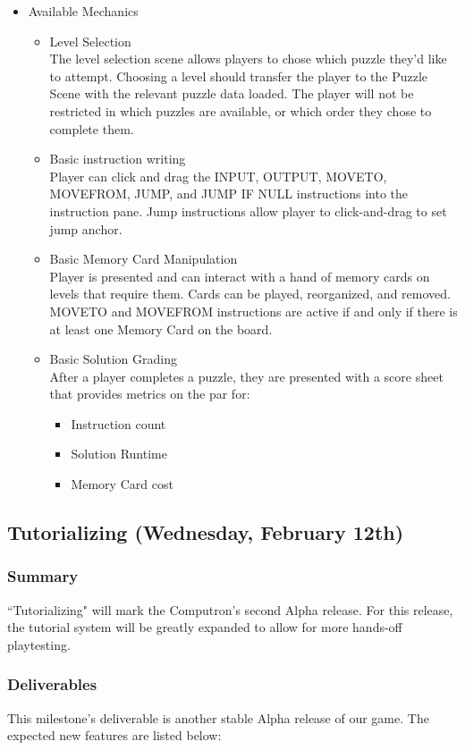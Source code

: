 \begin{itemize}
	\item Available Mechanics
	\begin{itemize}
		\item Level Selection\\
		The level selection scene allows players to chose which puzzle they'd like to attempt. 
		Choosing a level should transfer the player to the Puzzle Scene with the relevant puzzle 
		data loaded. The player will not be restricted in which puzzles are available, or which 
		order they chose to complete them.
		\item Basic instruction writing\\
		Player can click and drag the INPUT, OUTPUT, MOVETO, MOVEFROM, JUMP, and 
		JUMP IF NULL instructions into the instruction pane. Jump instructions allow player 
		to click-and-drag to set jump anchor.
		\item Basic Memory Card Manipulation\\
		Player is presented and can interact with a hand of memory cards on levels that require 
		them. Cards can be played, reorganized, and removed. MOVETO and MOVEFROM 
		instructions are active if and only if there is at least one Memory Card on the board.
		\item Basic Solution Grading\\
		After a player completes a puzzle, they are presented with a score sheet that provides 
		metrics on the par for:
		\begin{itemize}
			\item Instruction count
			\item Solution Runtime
			\item Memory Card cost
		\end{itemize}
	\end{itemize}
\end{itemize}

\subsection{Tutorializing (Wednesday, February 12th)}

\subsubsection*{Summary}
``Tutorializing" will mark the Computron's second Alpha release. For this release, the tutorial 
system will be greatly expanded to allow for more hands-off playtesting.

\subsubsection*{Deliverables}
This milestone’s deliverable is another stable Alpha release of our game. The expected new 
features are listed below:

